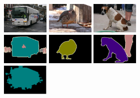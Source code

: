 \begin{figure}
\begin{subfigure}{0.4\textwidth}
		\includegraphics[width=0.25\textwidth]{figures/demo_images/result/compare/2010_005284.jpg}
		\includegraphics[width=0.25\textwidth]{figures/demo_images/result/compare/2007_003349.jpg}
		\includegraphics[width=0.25\textwidth]{figures/demo_images/result/compare/2009_004507.jpg} 
		\\
		\includegraphics[width=0.25\textwidth]{figures/demo_images/result/compare/2010_005284.png}
		\includegraphics[width=0.25\textwidth]{figures/demo_images/result/compare/2007_003349.png}
		\includegraphics[width=0.25\textwidth]{figures/demo_images/result/compare/2009_004507.png} \\
		\includegraphics[width=0.25\textwidth]{figures/demo_images/result/compare/zoom_bus.png}

\end{subfigure}
\end{figure}
